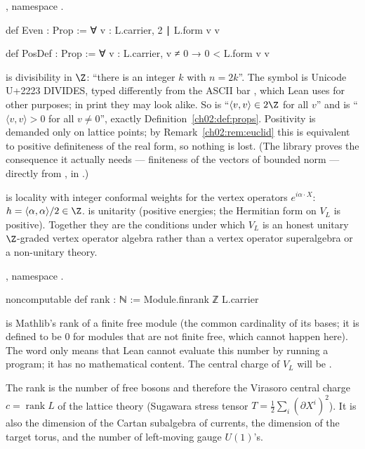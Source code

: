 \begin{definition}\label{ch02:def:voaevenposdef}
, namespace .
\end{definition}
\begin{leancode}
def Even : Prop := ∀ v : L.carrier, 2 ∣ L.form v v

def PosDef : Prop := ∀ v : L.carrier, v ≠ 0 → 0 < L.form v v
\end{leancode}
\begin{dictionary}
 is divisibility in $\Z$: ``there is an integer $k$ with $n=2k$''.  The symbol
 is Unicode U+2223 DIVIDES, typed differently from the ASCII bar \lean{|}, which Lean uses
for other purposes; in print they may look alike.
So  is ``$\langle v,v\rangle\in2\Z$ for all $v$'' and  is ``$\langle
v,v\rangle>0$ for all $v\neq0$'', exactly Definition~\ref{ch02:def:props}.  Positivity is
demanded only on lattice points; by Remark~\ref{ch02:rem:euclid} this is equivalent to positive
definiteness of the real form, so nothing is lost.  (The library proves the consequence it
actually needs --- finiteness of the vectors of bounded norm --- directly from , in
.)
\end{dictionary}
\begin{physics}
 is locality with integer conformal weights for the vertex operators $e^{i\alpha\cdot X}$: $h=\langle\alpha,\alpha\rangle/2\in\Z$.  is unitarity (positive energies; the Hermitian form on $V_L$ is positive). Together they are the conditions under which $V_L$ is an honest unitary $\Z$-graded vertex operator algebra rather than a vertex operator superalgebra or a non-unitary theory.
\end{physics}

\begin{definition}\label{ch02:def:voarank}
, namespace .
\end{definition}
\begin{leancode}
noncomputable def rank : ℕ := Module.finrank ℤ L.carrier
\end{leancode}
\begin{dictionary}
 is Mathlib's rank of a finite free module (the common cardinality of
its bases; it is defined to be $0$ for modules that are not finite free, which cannot happen
here).  The word  only means that Lean cannot evaluate this number by running
a program; it has no mathematical content.  The central charge of $V_L$ will be .
\end{dictionary}
\begin{physics}
The rank is the number of free bosons and therefore the Virasoro central charge $c=\operatorname{rank}L$ of the lattice theory (Sugawara stress tensor $T=\tfrac12\sum_i(\partial X^i)^2$). It is also the dimension of the Cartan subalgebra of currents, the dimension of the target torus, and the number of left-moving gauge $U(1)$'s.
\end{physics}

